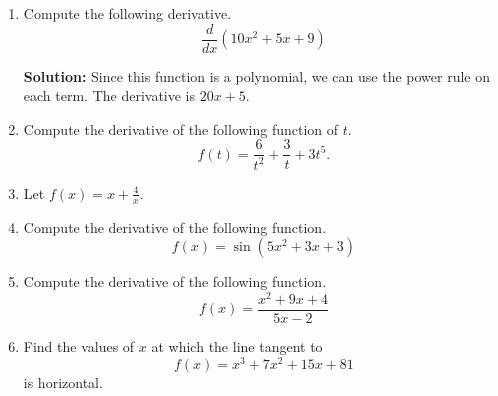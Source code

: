 \documentclass{article}
\begin{document}
\ActivityTitle[class=Calculus I, number=3, name=Differentiation I]

\begin{enumerate}
\item Compute the following derivative. \[ \frac{d}{dx} \left( 10 x^2 + 5 x + 9 \right) \]

\textbf{Solution:}
Since this function is a polynomial, we can use the power rule on each term. The derivative is $20 x + 5$.

  
\vspace{5cm}

\item Compute the derivative of the following function of $t$. \[ f(t) = \frac{6}{t^{2}} + \frac{3}{t} + 3 t^{5}. \]

  
\vspace{5cm}

\item Let $f(x) = x + \frac{4}{x}$.

  
\vspace{5cm}

\item Compute the derivative of the following function. \[ f(x) = \sin(5 x^2 + 3 x + 3) \]

  
\vspace{5cm}

\item Compute the derivative of the following function. \[ f(x) = \frac{x^2 + 9 x + 4}{5 x - 2} \]

  
\vspace{5cm}

\item Find the values of $x$ at which the line tangent to \[ f(x) = x^3 + 7 x^2 + 15 x + 81 \] is horizontal.

  
\vspace{5cm}
\end{enumerate}
\end{document}
